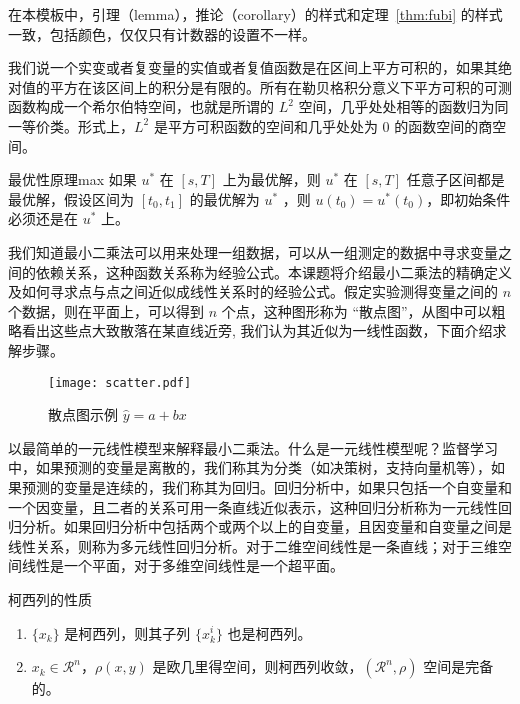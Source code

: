\documentclass[cn,11pt]{elegantbook}
\begin{document}
\begin{note}
在本模板中，引理（lemma），推论（corollary）的样式和定理~\ref{thm:fubi} 的样式一致，包括颜色，仅仅只有计数器的设置不一样。
\end{note}

我们说一个实变或者复变量的实值或者复值函数是在区间上平方可积的，如果其绝对值的平方在该区间上的积分是有限的。所有在勒贝格积分意义下平方可积的可测函数构成一个希尔伯特空间，也就是所谓的 $L^2$ 空间，几乎处处相等的函数归为同一等价类。形式上，$L^2$ 是平方可积函数的空间和几乎处处为 0 的函数空间的商空间。

\begin{proposition}{最优性原理}{max}
如果 $u^*$ 在 $[s,T]$ 上为最优解，则 $u^*$ 在 $[s, T]$ 任意子区间都是最优解，假设区间为 $[t_0, t_1]$ 的最优解为 $u^*$ ，则 $u(t_0)=u^{*}(t_0)$，即初始条件必须还是在 $u^*$ 上。
\end{proposition}

我们知道最小二乘法可以用来处理一组数据，可以从一组测定的数据中寻求变量之间的依赖关系，这种函数关系称为经验公式。本课题将介绍最小二乘法的精确定义及如何寻求点与点之间近似成线性关系时的经验公式。假定实验测得变量之间的 $n$ 个数据，则在平面上，可以得到 $n$ 个点，这种图形称为 “散点图”，从图中可以粗略看出这些点大致散落在某直线近旁, 我们认为其近似为一线性函数，下面介绍求解步骤。

\begin{figure}[htbp]
	\centering
	\texttt{[image: scatter.pdf]}
	\caption{散点图示例 $\hat{y}=a+bx$ \label{fig:scatter}}
\end{figure}

以最简单的一元线性模型来解释最小二乘法。什么是一元线性模型呢？监督学习中，如果预测的变量是离散的，我们称其为分类（如决策树，支持向量机等），如果预测的变量是连续的，我们称其为回归。回归分析中，如果只包括一个自变量和一个因变量，且二者的关系可用一条直线近似表示，这种回归分析称为一元线性回归分析。如果回归分析中包括两个或两个以上的自变量，且因变量和自变量之间是线性关系，则称为多元线性回归分析。对于二维空间线性是一条直线；对于三维空间线性是一个平面，对于多维空间线性是一个超平面。

\begin{property}\label{property:cauchy}
柯西列的性质
\begin{enumerate}
\item $\{x_k\}$ 是柯西列，则其子列 $\{x_k^i\}$ 也是柯西列。
\item $x_k\in \mathcal{R}^n$，$\rho(x,y)$ 是欧几里得空间，则柯西列收敛，$(\mathcal{R}^n,\rho)$ 空间是完备的。
\end{enumerate}
\end{property}
\end{document}
